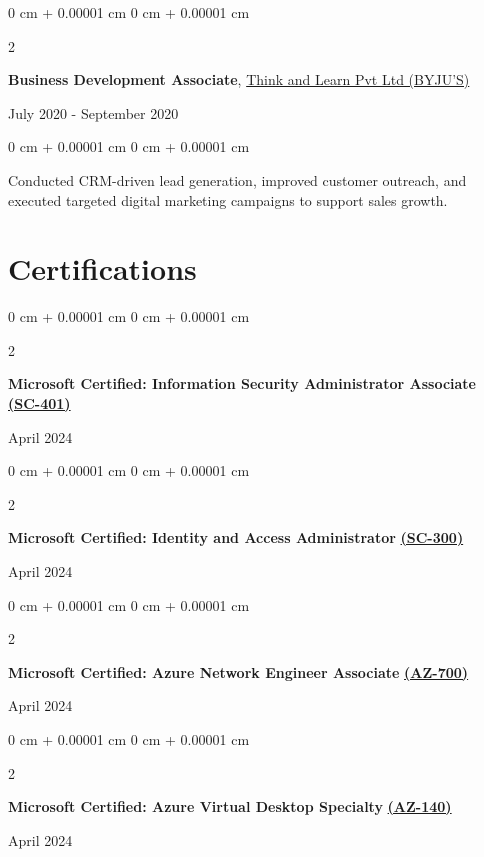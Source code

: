 \documentclass[10pt, letterpaper]{article}
\newenvironment{onecolentry}{
    \begin{adjustwidth}{
        0 cm + 0.00001 cm
    }{
        0 cm + 0.00001 cm
    }
}{
    \end{adjustwidth}
}
\newenvironment{twocolentry}[2][]{
    \onecolentry
    \def\secondColumn{#2}
    \setcolumnwidth{\fill, 4.5 cm}
    \begin{paracol}{2}
}{
    \switchcolumn \raggedleft \secondColumn
    \end{paracol}
    \endonecolentry
}
\begin{document}
\begin{twocolentry}{July 2020 - September 2020}
    \textbf{Business Development Associate}, \href{https://byjus.com/}{Think and Learn Pvt Ltd (BYJU'S)}
\end{twocolentry}

\vspace{0.10 cm}
\begin{onecolentry}
    Conducted CRM-driven lead generation, improved customer outreach, and executed targeted digital marketing campaigns to support sales growth.
\end{onecolentry}


\section{Certifications}

\vspace{0.2 cm}

\begin{twocolentry}{April 2024}
    \textbf{Microsoft Certified: Information Security Administrator Associate} \href{https://learn.microsoft.com/api/credentials/share/en-in/ChinmayDhokMAQSoftware-5822/175A9EF2AB5B5B56?sharingId=BC2982D57159EF1A}{\textbf{(SC-401)}}
\end{twocolentry}

\vspace{0.05 cm}
\begin{twocolentry}{April 2024}
    \textbf{Microsoft Certified: Identity and Access Administrator} \href{https://learn.microsoft.com/en-us/users/chinmaydhokmaqsoftware-5822/credentials/82be0c3d23d052b8}{\textbf{(SC-300)}}
\end{twocolentry}

\vspace{0.05 cm}
\begin{twocolentry}{April 2024}
    \textbf{Microsoft Certified: Azure Network Engineer Associate} \href{https://learn.microsoft.com/en-us/users/ChinmayDhokMAQSoftware-5822/credentials/4244163FEBBEDDAF}{\textbf{(AZ-700)}}
\end{twocolentry}

\vspace{0.05 cm}
\begin{twocolentry}{April 2024}
    \textbf{Microsoft Certified: Azure Virtual Desktop Specialty} \href{https://learn.microsoft.com/en-us/users/chinmaydhokmaqsoftware-5822/credentials/ccf1857230b93a53}{\textbf{(AZ-140)}}
\end{twocolentry}
\end{document}
